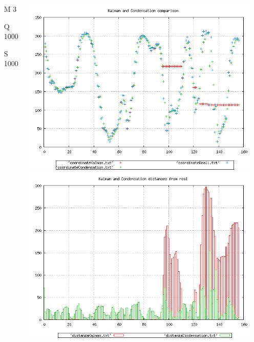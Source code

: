 {\begin{columns}
\begin{scriptsize}
\begin{itemize}
\item [M]3
\item [Q]1000
\item [S]1000
\end{itemize}
\end{scriptsize}
\includegraphics[scale=0.1]{../esperimenti/tappeto_nozoom/mod_3-Q_1000-S_1000/plot.png}\\
\includegraphics[scale=0.1]{../esperimenti/tappeto_nozoom/mod_3-Q_1000-S_1000/plot-distances.png}


\end{columns}}

